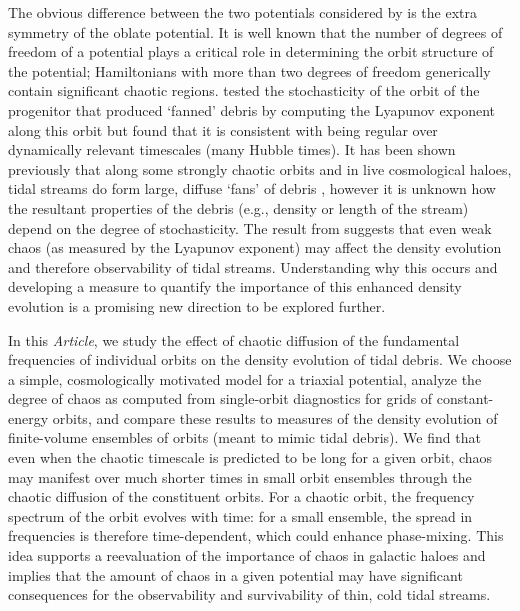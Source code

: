 \documentclass[letterpaper,12pt,preprint]{aastex}
\newcommand{\chchchanges}[1]{{\color{red} {#1}}}
\begin{document}
The obvious difference between the two potentials considered by \citet{pearson15} is the extra symmetry of the oblate potential. It is well known that the number of degrees of freedom of a potential plays a critical role in determining the orbit structure of the potential; Hamiltonians with more than two degrees of freedom generically contain significant chaotic regions. \citet{pearson15} tested the stochasticity of the orbit of the progenitor that produced `fanned' debris by computing the Lyapunov exponent along this orbit but found that it is consistent with being regular over dynamically relevant timescales (many Hubble times). It has been shown previously that along some strongly chaotic orbits and in live cosmological haloes, tidal streams do form large, diffuse `fans' of debris \citep[e.g.,][]{fardal14, ngan15}, however it is unknown how the resultant properties of the debris (e.g., density or length of the stream) depend on the degree of stochasticity. The result from \citet{pearson15} suggests that even weak chaos (as measured by the Lyapunov exponent) may affect the density evolution and therefore observability of tidal streams. Understanding why this occurs and developing a measure to quantify the importance of this enhanced density evolution is a promising new direction to be explored further.

In this \emph{Article}, we study the effect of chaotic diffusion of the fundamental frequencies of individual orbits on the density evolution of tidal debris. We choose a simple, cosmologically motivated model for a triaxial potential, analyze the degree of chaos as computed from single-orbit diagnostics for grids of constant-energy orbits, and compare these results to measures of the density evolution of finite-volume ensembles of orbits (meant to mimic tidal debris). We find that even when the chaotic timescale is predicted to be long for a given orbit, chaos may manifest over much shorter times in small orbit ensembles through the chaotic diffusion of the \chchchanges{constituent} orbits. For a chaotic orbit, the frequency spectrum of the orbit evolves with time: for a small ensemble, the spread in frequencies is therefore time-dependent, which could enhance phase-mixing. This idea supports a reevaluation of the importance of chaos in galactic haloes and implies that the amount of chaos in a given potential may have significant consequences for the observability and survivability of thin, cold tidal streams. 
\end{document}

